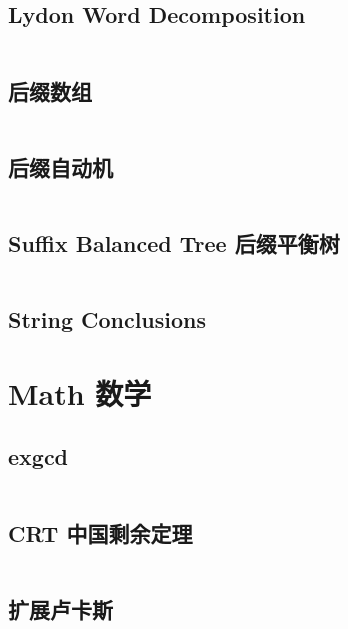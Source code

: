 \documentclass[titlepage, a4paper]{article}
\begin{document}
\begin{multicols}{2}
\begin{spacing}{0.6}
				\subsection{Lydon Word Decomposition}
				\inputminted{cpp}{src/String/Lyndon Word.cpp}
				\subsection{后缀数组 \checkmark}
				\inputminted{cpp}{src/String/SA.cpp}
				\subsection{后缀自动机}
				\inputminted{cpp}{src/String/SAM.cpp}
				\subsection{Suffix Balanced Tree 后缀平衡树}
				\inputminted{cpp}{src/String/后缀平衡树.cpp}
				\subsection{String Conclusions}
				
			
			\section{Math 数学}
				\subsection{exgcd}
				\inputminted{cpp}{src/Math/exgcd.cpp}
				\subsection{CRT 中国剩余定理}
				\inputminted{cpp}{src/Math/CRT_lbn.cpp}
				\subsection{扩展卢卡斯}
				\inputminted{cpp}{src/Math/扩展卢卡斯.cpp}

\end{spacing}
\end{multicols}
\end{document}
